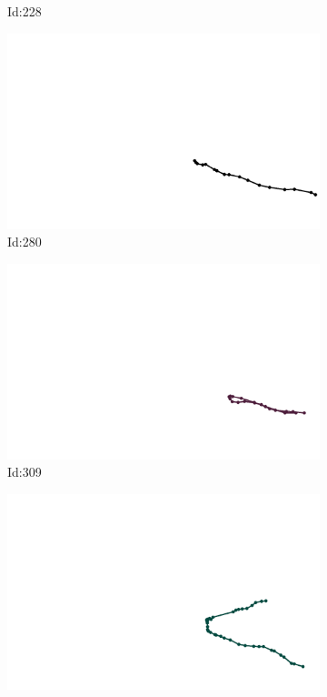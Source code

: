 \documentclass[12pt,twoside]{report}
\begin{document}
\begin{figure}
\begin{subfigure}[b]{0.20\textwidth}
\caption{Id:228}
\end{subfigure}
\begin{subfigure}[b]{0.20\textwidth}
\centering
\includegraphics[width=\textwidth]{../trajectories/280.png}
\caption{Id:280}
\end{subfigure}
\begin{subfigure}[b]{0.20\textwidth}
\centering
\includegraphics[width=\textwidth]{../trajectories/309.png}
\caption{Id:309}
\end{subfigure}
\begin{subfigure}[b]{0.20\textwidth}
\centering
\includegraphics[width=\textwidth]{../trajectories/318.png}

\end{subfigure}
\end{figure}
\end{document}
